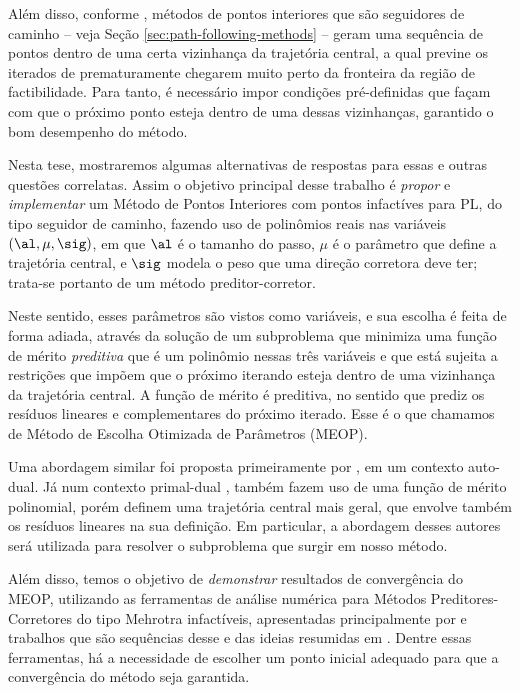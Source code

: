 Além disso, conforme \textcite{Hung:1996br}, métodos de pontos interiores que são seguidores de caminho  -- veja Seção \ref{sec:path-following-methods} --  geram uma sequência de pontos dentro de uma certa vizinhança da  trajetória central, a qual previne os iterados de prematuramente chegarem muito perto da fronteira da região de factibilidade. Para tanto, é necessário impor condições pré-definidas que façam com que o próximo ponto esteja dentro de uma dessas vizinhanças, garantido  o bom desempenho do método. 




Nesta tese, mostraremos algumas alternativas de respostas para  essas e outras questões correlatas. Assim o objetivo principal desse trabalho é \emph{propor} e \emph{implementar} um Método de Pontos Interiores com pontos infactíves para \ac{PL}, do tipo seguidor de caminho, fazendo  uso de polinômios reais nas variáveis $(\al,\mu,\sig)$, em que $\al$ é o tamanho do passo, $\mu$ é o parâmetro que define a trajetória central, e $\sig$ modela o peso que uma direção corretora deve ter; trata-se portanto de um método preditor-corretor. 

Neste sentido, esses parâmetros são vistos como variáveis, e sua escolha é feita de forma adiada, através da solução de um subproblema que minimiza uma função de mérito \emph{preditiva} que é um polinômio nessas três variáveis e que está sujeita a restrições que impõem que o próximo iterando esteja dentro de uma vizinhança da trajetória central. A função de mérito é preditiva, no sentido que prediz os resíduos lineares e complementares do próximo iterado. Esse é  o que chamamos de Método de Escolha Otimizada de Parâmetros (MEOP).


Uma abordagem similar foi proposta primeiramente por \textcite{VillasBoas:2003tg}, em um contexto auto-dual. Já num contexto primal-dual \textcite{VillasBoas:2012ur,VillasBoas2013:wn}, também fazem uso de uma função de mérito polinomial, porém definem uma trajetória central mais geral, que envolve também os resíduos lineares na sua definição.  Em particular, a abordagem desses autores será utilizada para resolver o subproblema que surgir em nosso método.

Além disso, temos o objetivo de \emph{demonstrar} resultados de convergência do MEOP, utilizando as ferramentas de análise numérica para Métodos Preditores-Corretores do tipo Mehrotra infactíveis, apresentadas principalmente por \textcite{Zhang:2006ic} e trabalhos que são sequências desse e das ideias resumidas em \textcite[cap. 7]{Wright:Primal-dual-interior-point:1997h}. Dentre essas ferramentas, há a necessidade de escolher um ponto inicial adequado para que a convergência do método seja garantida.  

